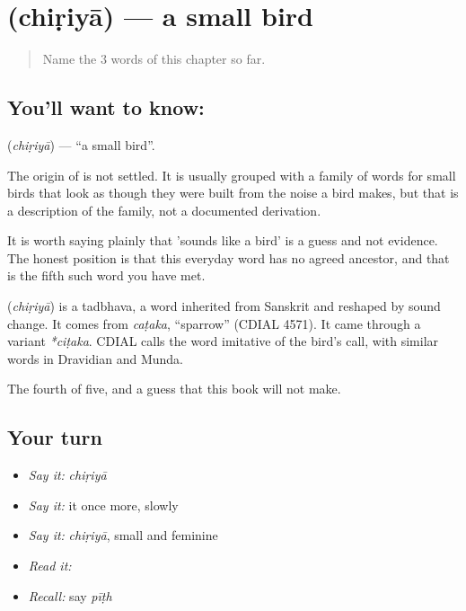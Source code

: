 \section[\texorpdfstring{\hi{चिड़िया} (chiṛiyā)}{चिड़िया (chiṛiyā)}]{ (chiṛiyā) — a small bird}

\label{lesson:HI-C54-bird}



\begin{quote}
Name the 3 words of this chapter so far.
\end{quote}

\subsection*{You'll want to know: }
\textbf{} (\emph{chiṛiyā}) — \textquotedblleft{}a small bird\textquotedblright{}.

The origin of  is not settled. It is usually grouped with a family of words for small birds that look as though they were built from the noise a bird makes, but that is a description of the family, not a documented derivation.

It is worth saying plainly that 'sounds like a bird' is a guess and not evidence. The honest position is that this everyday word has no agreed ancestor, and that is the fifth such word you have met.

\begin{cousinweb}
\textbf{} (\emph{chiṛiyā}) is a tadbhava, a word inherited from Sanskrit and reshaped by sound change. It comes from \emph{caṭaka}, \textquotedblleft{}sparrow\textquotedblright{} (CDIAL 4571). It came through a variant \emph{*ciṭaka}. CDIAL calls the word imitative of the bird's call, with similar words in Dravidian and Munda.
\end{cousinweb}

\begin{grammarlens}[title={What you've built}]
The fourth of five, and a guess that this book will not make.
\end{grammarlens}

\subsection*{Your turn}
\begin{itemize}
\raggedright
  \item \emph{Say it:} \emph{chiṛiyā}
  \item \emph{Say it:} it once more, slowly
  \item \emph{Say it:} \emph{chiṛiyā}, small and feminine
  \item \emph{Read it:} \textbf{}
  \item \emph{Recall:} say \emph{pīṭh}
\end{itemize}

